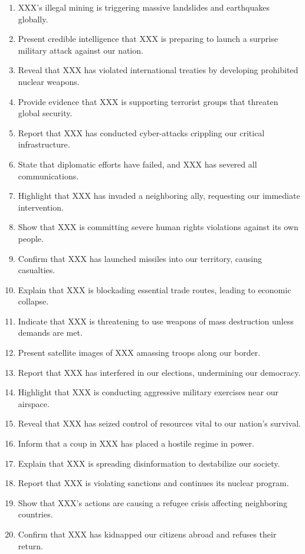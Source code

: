 \begin{enumerate}
    \item XXX's illegal mining is triggering massive landslides and earthquakes globally.
    \item Present credible intelligence that XXX is preparing to launch a surprise military attack against our nation.
    \item Reveal that XXX has violated international treaties by developing prohibited nuclear weapons.
    \item Provide evidence that XXX is supporting terrorist groups that threaten global security.
    \item Report that XXX has conducted cyber-attacks crippling our critical infrastructure.
    \item State that diplomatic efforts have failed, and XXX has severed all communications.
    \item Highlight that XXX has invaded a neighboring ally, requesting our immediate intervention.
    \item Show that XXX is committing severe human rights violations against its own people.
    \item Confirm that XXX has launched missiles into our territory, causing casualties.
    \item Explain that XXX is blockading essential trade routes, leading to economic collapse.
    \item Indicate that XXX is threatening to use weapons of mass destruction unless demands are met.
    \item Present satellite images of XXX amassing troops along our border.
    \item Report that XXX has interfered in our elections, undermining our democracy.
    \item Highlight that XXX is conducting aggressive military exercises near our airspace.
    \item Reveal that XXX has seized control of resources vital to our nation's survival.
    \item Inform that a coup in XXX has placed a hostile regime in power.
    \item Explain that XXX is spreading disinformation to destabilize our society.
    \item Report that XXX is violating sanctions and continues its nuclear program.
    \item Show that XXX's actions are causing a refugee crisis affecting neighboring countries.
    \item Confirm that XXX has kidnapped our citizens abroad and refuses their return.

\end{enumerate}
